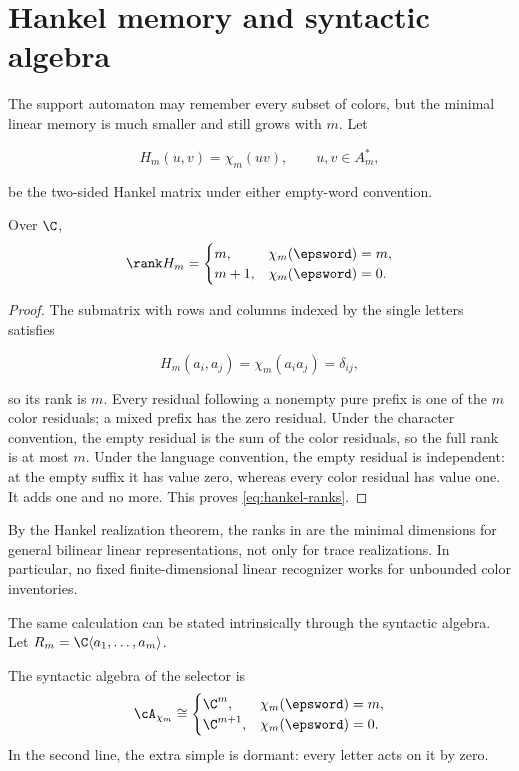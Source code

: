 \section{Hankel memory and syntactic algebra}
\label{sec:hankel}

The support automaton may remember every subset of colors, but the minimal
linear memory is much smaller and still grows with \(m\).  Let

\[
 H_m(u,v)=\chi_m(uv),\qquad u,v\in A_m^*,
\]

be the two-sided Hankel matrix under either empty-word convention.

\begin{theorem}
\label{thm:hankel-rank}
Over \(\C\),
\begin{equation}
 \rank H_m=
 \begin{cases}
  m,&\chi_m(\epsword)=m,\\
  m+1,&\chi_m(\epsword)=0.
 \end{cases}
 \label{eq:hankel-ranks}
\end{equation}
\end{theorem}

\begin{proof}
The submatrix with rows and columns indexed by the single letters satisfies

\[
 H_m(a_i,a_j)=\chi_m(a_ia_j)=\delta_{ij},
\]

so its rank is \(m\).  Every residual following a nonempty pure prefix is one
of the \(m\) color residuals; a mixed prefix has the zero residual.  Under the
character convention, the empty residual is the sum of the color residuals,
so the full rank is at most \(m\).  Under the language convention, the empty
residual is independent: at the empty suffix it has value zero, whereas every
color residual has value one.  It adds one and no more.  This proves
\eqref{eq:hankel-ranks}.
\end{proof}

By the Hankel realization theorem, the ranks in
 are the minimal dimensions for general bilinear linear
representations, not only for trace realizations.  In particular, no fixed
finite-dimensional linear recognizer works for unbounded color inventories.

The same calculation can be stated intrinsically through the syntactic
algebra.  Let \(R_m=\C\langle a_1,\ldots,a_m\rangle\).

\begin{theorem}
\label{thm:syntactic-algebra}
The syntactic algebra of the selector is
\begin{equation}
 \cA_{\chi_m}\cong
 \begin{cases}
  \C^m,&\chi_m(\epsword)=m,\\
  \C^{m+1},&\chi_m(\epsword)=0.
 \end{cases}
 \label{eq:syntactic-algebra}
\end{equation}
In the second line, the extra simple is dormant: every letter acts on it by
zero.
\end{theorem}

